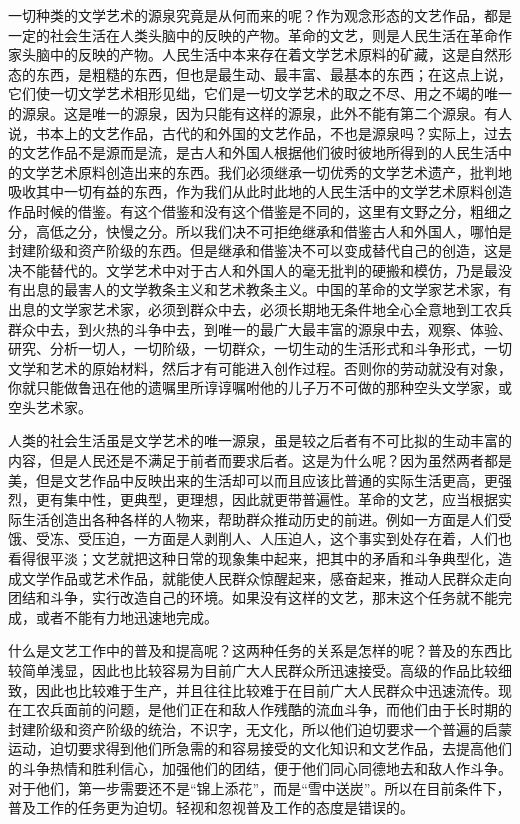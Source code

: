 一切种类的文学艺术的源泉究竟是从何而来的呢？作为观念形态的文艺作品，都是一定的社会生活在人类头脑中的反映的产物。革命的文艺，则是人民生活在革命作家头脑中的反映的产物。人民生活中本来存在着文学艺术原料的矿藏，这是自然形态的东西，是粗糙的东西，但也是最生动、最丰富、最基本的东西；在这点上说，它们使一切文学艺术相形见绌，它们是一切文学艺术的取之不尽、用之不竭的唯一的源泉。这是唯一的源泉，因为只能有这样的源泉，此外不能有第二个源泉。有人说，书本上的文艺作品，古代的和外国的文艺作品，不也是源泉吗？实际上，过去的文艺作品不是源而是流，是古人和外国人根据他们彼时彼地所得到的人民生活中的文学艺术原料创造出来的东西。我们必须继承一切优秀的文学艺术遗产，批判地吸收其中一切有益的东西，作为我们从此时此地的人民生活中的文学艺术原料创造作品时候的借鉴。有这个借鉴和没有这个借鉴是不同的，这里有文野之分，粗细之分，高低之分，快慢之分。所以我们决不可拒绝继承和借鉴古人和外国人，哪怕是封建阶级和资产阶级的东西。但是继承和借鉴决不可以变成替代自己的创造，这是决不能替代的。文学艺术中对于古人和外国人的毫无批判的硬搬和模仿，乃是最没有出息的最害人的文学教条主义和艺术教条主义。中国的革命的文学家艺术家，有出息的文学家艺术家，必须到群众中去，必须长期地无条件地全心全意地到工农兵群众中去，到火热的斗争中去，到唯一的最广大最丰富的源泉中去，观察、体验、研究、分析一切人，一切阶级，一切群众，一切生动的生活形式和斗争形式，一切文学和艺术的原始材料，然后才有可能进入创作过程。否则你的劳动就没有对象，你就只能做鲁迅在他的遗嘱里所谆谆嘱咐他的儿子万不可做的那种空头文学家，或空头艺术家。

人类的社会生活虽是文学艺术的唯一源泉，虽是较之后者有不可比拟的生动丰富的内容，但是人民还是不满足于前者而要求后者。这是为什么呢？因为虽然两者都是美，但是文艺作品中反映出来的生活却可以而且应该比普通的实际生活更高，更强烈，更有集中性，更典型，更理想，因此就更带普遍性。革命的文艺，应当根据实际生活创造出各种各样的人物来，帮助群众推动历史的前进。例如一方面是人们受饿、受冻、受压迫，一方面是人剥削人、人压迫人，这个事实到处存在着，人们也看得很平淡；文艺就把这种日常的现象集中起来，把其中的矛盾和斗争典型化，造成文学作品或艺术作品，就能使人民群众惊醒起来，感奋起来，推动人民群众走向团结和斗争，实行改造自己的环境。如果没有这样的文艺，那末这个任务就不能完成，或者不能有力地迅速地完成。

什么是文艺工作中的普及和提高呢？这两种任务的关系是怎样的呢？普及的东西比较简单浅显，因此也比较容易为目前广大人民群众所迅速接受。高级的作品比较细致，因此也比较难于生产，并且往往比较难于在目前广大人民群众中迅速流传。现在工农兵面前的问题，是他们正在和敌人作残酷的流血斗争，而他们由于长时期的封建阶级和资产阶级的统治，不识字，无文化，所以他们迫切要求一个普遍的启蒙运动，迫切要求得到他们所急需的和容易接受的文化知识和文艺作品，去提高他们的斗争热情和胜利信心，加强他们的团结，便于他们同心同德地去和敌人作斗争。对于他们，第一步需要还不是“锦上添花”，而是“雪中送炭”。所以在目前条件下，普及工作的任务更为迫切。轻视和忽视普及工作的态度是错误的。

